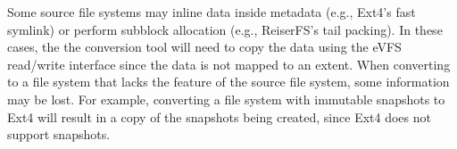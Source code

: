 Some source file systems may inline data inside metadata (e.g., Ext4's fast symlink) or perform subblock allocation (e.g., ReiserFS's tail packing). In these cases, the the conversion tool will need to copy the data using the eVFS read/write interface since the data is not mapped to an extent. When converting to a file system that lacks the feature of the source file system, some information may be lost. For example, converting a file system with immutable snapshots to Ext4 will result in a copy of the snapshots being created, since Ext4 does not support snapshots. 





